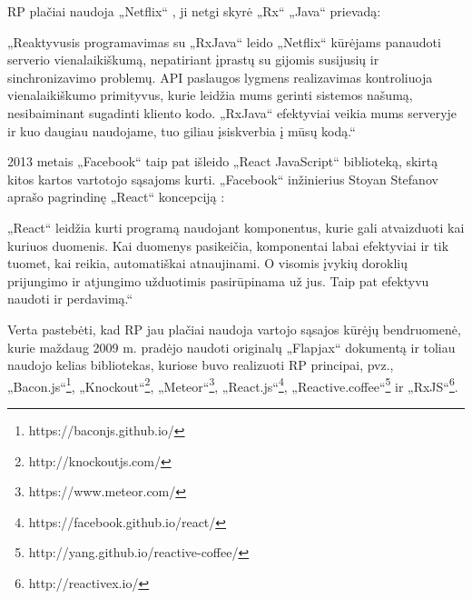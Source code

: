 RP plačiai naudoja „Netflix“ \cite{Netflix}, ji netgi skyrė „Rx“ „Java“ prievadą:

„Reaktyvusis programavimas su „RxJava“ leido „Netflix“ kūrėjams panaudoti serverio vienalaikiškumą, nepatiriant įprastų su gijomis susijusių ir sinchronizavimo problemų. API paslaugos lygmens realizavimas kontroliuoja vienalaikiškumo primityvus, kurie leidžia mums gerinti sistemos našumą, nesibaiminant sugadinti kliento kodo. „RxJava“ efektyviai veikia mums serveryje ir kuo daugiau naudojame, tuo giliau įsiskverbia į mūsų kodą.“

2013 metais „Facebook“ taip pat išleido „React JavaScript“ biblioteką, skirtą kitos kartos vartotojo sąsajoms kurti. „Facebook“ inžinierius Stoyan Stefanov aprašo pagrindinę „React“ koncepciją \cite{React}:

„React“ leidžia kurti programą naudojant komponentus, kurie gali atvaizduoti kai kuriuos duomenis. Kai duomenys pasikeičia, komponentai labai efektyviai ir tik tuomet, kai reikia, automatiškai atnaujinami. O visomis įvykių doroklių prijungimo ir atjungimo užduotimis pasirūpinama už jus. Taip pat efektyvu naudoti ir perdavimą.“

Verta pastebėti, kad RP jau plačiai naudoja vartojo sąsajos kūrėjų bendruomenė, kurie maždaug 2009 m. pradėjo naudoti originalų „Flapjax“ dokumentą \cite{Meyerovich:2009:FPL:1639949.1640091} ir toliau naudojo kelias bibliotekas, kuriose buvo realizuoti RP principai, pvz., „Bacon.js“\footnote{https://baconjs.github.io/}, „Knockout“\footnote{http://knockoutjs.com/}, „Meteor“\footnote{https://www.meteor.com/}, „React.js“\footnote{https://facebook.github.io/react/}, „Reactive.coffee“\footnote{http://yang.github.io/reactive-coffee/} ir „RxJS“\footnote{http://reactivex.io/}.
